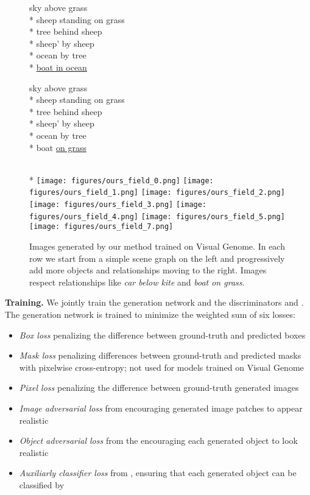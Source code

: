 \documentclass[10pt,twocolumn,letterpaper]{article}
\begin{document}
\begin{figure*}[ht]
  \begin{minipage}{\progsize}
    \centering
    \ssmall
    sky above grass \\*
    sheep standing on grass \\*
    tree behind sheep \\*
    sheep' by sheep \\*
    ocean by tree \\*
    \underline{boat in ocean}
  \end{minipage}
  \begin{minipage}{\progsize}
    \centering
    \ssmall
    sky above grass \\*
    sheep standing on grass \\*
    tree behind sheep \\*
    sheep' by sheep \\*
    ocean by tree \\*
    boat \underline{on grass}
  \end{minipage} \\*
  \texttt{[image: figures/ours\_field\_0.png]}
  \texttt{[image: figures/ours\_field\_1.png]}
  \texttt{[image: figures/ours\_field\_2.png]}
  \texttt{[image: figures/ours\_field\_3.png]}
  \texttt{[image: figures/ours\_field\_4.png]}
  \texttt{[image: figures/ours\_field\_5.png]}
  \texttt{[image: figures/ours\_field\_7.png]}
  \caption{
    Images generated by our method trained on Visual Genome. In each row we
    start from a simple scene graph on the left and progressively add more
    objects and relationships moving to the right. Images respect
    relationships like \emph{car below kite} and \emph{boat on grass}.
  }
  \vspace{-4mm}
  \label{fig:manual}
\end{figure*}
 
\textbf{Training.}
We jointly train the generation network  and the discriminators 
and . The generation network is trained to minimize the weighted sum of
six losses:

\begin{itemize}[leftmargin=*]
  \setlength\itemsep{-1mm}
  \item \emph{Box loss} 
    penalizing the  difference between ground-truth and predicted boxes
  \item \emph{Mask loss}  penalizing differences between
    ground-truth and predicted masks with pixelwise
    cross-entropy; not used for models trained on Visual Genome
  \item \emph{Pixel loss}  penalizing the
     difference between ground-truth generated images
  \item \emph{Image adversarial loss}  from 
    encouraging generated image patches to appear realistic
  \item \emph{Object adversarial loss}  from the 
    encouraging each generated object to look realistic
  \item \emph{Auxiliarly classifier loss}  from ,
    ensuring that each generated object can be classified by 
\end{itemize}
\end{document}
